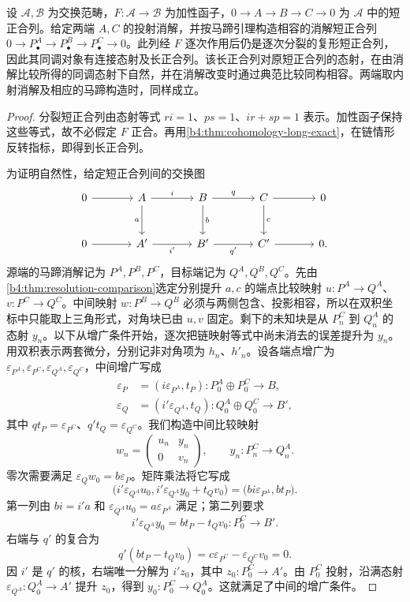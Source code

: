 \begin{proposition}\label{b4:prop:horseshoe-functor-sequence}
	设 \(\mathcal A,\mathcal B\) 为交换范畴，\(F:\mathcal A\to\mathcal B\) 为加性函子，\(0\to A\to B\to C\to0\) 为 \(\mathcal A\) 中的短正合列。给定两端 \(A,C\) 的投射消解，并按马蹄引理构造相容的消解短正合列 \(0\to P^A_\bullet\to P^B_\bullet\to P^C_\bullet\to0\)。此列经 \(F\) 逐次作用后仍是逐次分裂的复形短正合列，因此其同调对象有连接态射及长正合列。该长正合列对原短正合列的态射，在由消解比较所得的同调态射下自然，并在消解改变时通过典范比较同构相容。两端取内射消解及相应的马蹄构造时，同样成立。
\end{proposition}
\begin{proof}
	分裂短正合列由态射等式 \(ri=1\)、\(ps=1\)、\(ir+sp=1\) 表示。加性函子保持这些等式，故不必假定 \(F\) 正合。再用\cref{b4:thm:cohomology-long-exact}，在链情形反转指标，即得到长正合列。

	为证明自然性，给定短正合列间的交换图
	\[
		\begin{tikzcd}[column sep=large,row sep=large]
			0\arrow[r]&A\arrow[r,"i"]\arrow[d,"a"'] &B\arrow[r,"q"]\arrow[d,"b"] &C\arrow[r]\arrow[d,"c"]&0\\
			0\arrow[r]&A'\arrow[r,"i'"'] &B'\arrow[r,"q'"']&C'\arrow[r]&0.
		\end{tikzcd}
	\]
	源端的马蹄消解记为 \(P^A,P^B,P^C\)，目标端记为 \(Q^A,Q^B,Q^C\)。先由\cref{b4:thm:resolution-comparison}选定分别提升 \(a,c\) 的端点比较映射 \(u:P^A\to Q^A\)、\(v:P^C\to Q^C\)。中间映射 \(w:P^B\to Q^B\) 必须与两侧包含、投影相容，所以在双积坐标中只能取上三角形式，对角块已由 \(u,v\) 固定。剩下的未知块是从 \(P_n^C\) 到 \(Q_n^A\) 的态射 \(y_n\)。以下从增广条件开始，逐次把链映射等式中尚未消去的误差提升为 \(y_n\)。用双积表示两套微分，分别记非对角项为 \(h_n\)、\(h'_n\)。设各端点增广为 \(\varepsilon_{P^A},\varepsilon_{P^C},\varepsilon_{Q^A},\varepsilon_{Q^C}\)，中间增广写成
	\[
		\begin{aligned}
			\varepsilon_P&=(i\varepsilon_{P^A},t_P): P_0^A\oplus P_0^C\longrightarrow B,\\
			\varepsilon_Q&=(i'\varepsilon_{Q^A},t_Q): Q_0^A\oplus Q_0^C\longrightarrow B',
		\end{aligned}
	\]
	其中 \(qt_P=\varepsilon_{P^C}\)、\(q't_Q=\varepsilon_{Q^C}\)。我们构造中间比较映射
	\[
		w_n=\begin{pmatrix}u_n&y_n\\0&v_n\end{pmatrix},
		\qquad y_n:P_n^C\longrightarrow Q_n^A.
	\]
	零次需要满足 \(\varepsilon_Qw_0=b\varepsilon_P\)。矩阵乘法将它写成
	\[
		\bigl(i'\varepsilon_{Q^A}u_0, i'\varepsilon_{Q^A}y_0+t_Qv_0\bigr) =\bigl(bi\varepsilon_{P^A},bt_P\bigr).
	\]
	第一列由 \(bi=i'a\) 和 \(\varepsilon_{Q^A}u_0=a\varepsilon_{P^A}\) 满足；第二列要求
	\[
		i'\varepsilon_{Q^A}y_0=bt_P-t_Qv_0: P_0^C\longrightarrow B'.
	\]
	右端与 \(q'\) 的复合为
	\[
		q'(bt_P-t_Qv_0) =c\varepsilon_{P^C}-\varepsilon_{Q^C}v_0=0.
	\]
	因 \(i'\) 是 \(q'\) 的核，右端唯一分解为 \(i'z_0\)，其中 \(z_0:P_0^C\to A'\)。由 \(P_0^C\) 投射，沿满态射 \(\varepsilon_{Q^A}:Q_0^A\to A'\) 提升 \(z_0\)，得到 \(y_0:P_0^C\to Q_0^A\)。这就满足了中间的增广条件。


\end{proof}

